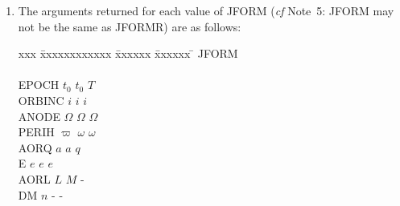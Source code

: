 \documentclass[11pt,twoside]{article}
\begin{document}
{\begin{enumerate}
        \begin{tabbing}
        xx \= xxxxxxxxxx \= xxxxxxxxxxx \= \kill
        \> JFORMR   \> JFORM   \> meaning \\ \\
        \> ~~~~~1   \> ~~~~~1  \> OK: elements are in the requested format \\
        \> ~~~~~1   \> ~~~~~2  \> never happens \\
        \> ~~~~~1   \> ~~~~~3  \> orbit not elliptical \\
        \> ~~~~~2   \> ~~~~~1  \> never happens \\
        \> ~~~~~2   \> ~~~~~2  \> OK: elements are in the requested format \\
        \> ~~~~~2   \> ~~~~~3  \> orbit not elliptical \\
        \> ~~~~~3   \> ~~~~~1  \> never happens \\
        \> ~~~~~3   \> ~~~~~2  \> never happens \\
        \> ~~~~~3   \> ~~~~~3  \> OK: elements are in the requested format
        \end{tabbing}
  \item The arguments returned for each value of JFORM ({\it cf}\/ Note~5:
        JFORM may not be the same as JFORMR) are as follows:

        \begin{tabbing}
        xxx \= xxxxxxxxxxxx \= xxxxxx \= xxxxxx \= \kill
        \> JFORM                   \\ \\
        \> EPOCH  \> $t_0$    \> $t_0$    \> $T$ \\
        \> ORBINC \> $i$      \> $i$      \> $i$ \\
        \> ANODE  \> $\Omega$ \> $\Omega$ \> $\Omega$ \\
        \> PERIH  \> $\varpi$ \> $\omega$ \> $\omega$ \\
        \> AORQ   \> $a$      \> $a$      \> $q$ \\
        \> E      \> $e$      \> $e$      \> $e$ \\
        \> AORL   \> $L$      \> $M$      \> - \\
        \> DM     \> $n$      \> -        \> -
        \end{tabbing}


\end{enumerate}}
\end{document}
